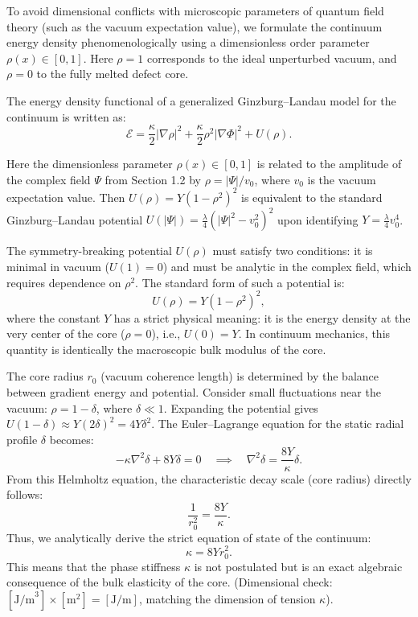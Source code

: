 \documentclass[11pt,a4paper]{article}
\begin{document}
To avoid dimensional conflicts with microscopic parameters of quantum field theory (such as the vacuum expectation value), we formulate the continuum energy density phenomenologically using a dimensionless order parameter $\rho(x) \in [0,1]$. Here $\rho = 1$ corresponds to the ideal unperturbed vacuum, and $\rho = 0$ to the fully melted defect core.

The energy density functional of a generalized Ginzburg–Landau model for the continuum is written as:
\begin{equation}
\mathcal{E} = \frac{\kappa}{2} |\nabla \rho|^2 + \frac{\kappa}{2} \rho^2 |\nabla \Phi|^2 + U(\rho).
\end{equation}

Here the dimensionless parameter $\rho(x) \in [0,1]$ is related to the amplitude of the complex field $\Psi$ from Section 1.2 by $\rho = |\Psi|/v_0$, where $v_0$ is the vacuum expectation value. Then $U(\rho) = Y(1-\rho^2)^2$ is equivalent to the standard Ginzburg–Landau potential $U(|\Psi|) = \frac{\lambda}{4}(|\Psi|^2 - v_0^2)^2$ upon identifying $Y = \frac{\lambda}{4}v_0^4$.

The symmetry-breaking potential $U(\rho)$ must satisfy two conditions: it is minimal in vacuum ($U(1)=0$) and must be analytic in the complex field, which requires dependence on $\rho^2$. The standard form of such a potential is:
\begin{equation}
U(\rho) = Y (1 - \rho^2)^2,
\end{equation}
where the constant $Y$ has a strict physical meaning: it is the energy density at the very center of the core ($\rho=0$), i.e., $U(0) = Y$. In continuum mechanics, this quantity is identically the macroscopic bulk modulus of the core.

The core radius $r_0$ (vacuum coherence length) is determined by the balance between gradient energy and potential. Consider small fluctuations near the vacuum: $\rho = 1 - \delta$, where $\delta \ll 1$. Expanding the potential gives $U(1-\delta) \approx Y(2\delta)^2 = 4Y\delta^2$.
The Euler–Lagrange equation for the static radial profile $\delta$ becomes:
\begin{equation}
-\kappa \nabla^2 \delta + 8Y \delta = 0 \quad \implies \quad \nabla^2 \delta = \frac{8Y}{\kappa} \delta .
\end{equation}
From this Helmholtz equation, the characteristic decay scale (core radius) directly follows:
\begin{equation}
\frac{1}{r_0^2} = \frac{8Y}{\kappa}.
\end{equation}
Thus, we analytically derive the strict equation of state of the continuum:
\begin{equation}
\kappa = 8 Y r_0^2.
\end{equation}
This means that the phase stiffness $\kappa$ is not postulated but is an exact algebraic consequence of the bulk elasticity of the core. (Dimensional check: $[\text{J/m}^3] \times [\text{m}^2] = [\text{J/m}]$, matching the dimension of tension $\kappa$).
\end{document}

